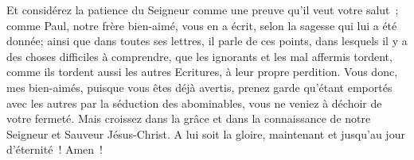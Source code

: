 \begin{multicols}{2}
Et considérez la patience du Seigneur comme une preuve qu'il veut votre salut~; comme Paul, notre frère bien-aimé, vous en a écrit, selon la sagesse qui lui a été donnée;
ainsi que dans toutes ses lettres, il parle de ces points, dans lesquels il y a des choses difficiles à comprendre, que les ignorants et les mal affermis tordent, comme ils tordent aussi les autres Ecritures, à leur propre perdition.
Vous donc, mes bien-aimés, puisque vous êtes déjà avertis, prenez garde qu'étant emportés avec les autres par la séduction des abominables, vous ne veniez à déchoir de votre fermeté.
Mais croissez dans la grâce et dans la connaissance de notre Seigneur et Sauveur Jésus-Christ. A lui soit la gloire, maintenant et jusqu'au jour d'éternité~! Amen~!
\PPE{}
\end{multicols}
